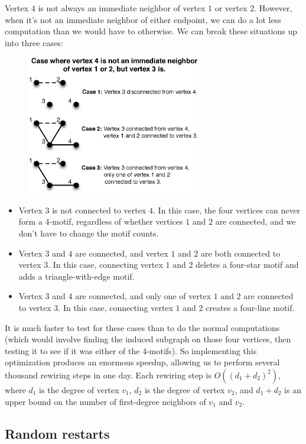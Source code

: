 Vertex $4$ is not always an immediate neighbor of vertex $1$ or vertex $2$.  However, when it's not an immediate neighbor of either endpoint, we can do a lot less computation than we would have to otherwise.  We can break these situations up into three cases:

\begin{figure}[t]
\centering
\includegraphics[width=3in]{Figures/case1.eps}
\label{fig:case}
\end{figure}

\begin{itemize}
\item Vertex $3$ is not connected to vertex $4$.  In this case, the four vertices can never form a 4-motif, regardless of whether vertices $1$ and $2$ are connected, and we don't have to change the motif counts.
\item Vertex $3$ and $4$ are connected, and vertex $1$ and $2$ are both connected to vertex $3$.  In this case, connecting vertex $1$ and $2$ deletes a four-star motif and adds a triangle-with-edge motif.
\item Vertex $3$ and $4$ are connected, and only one of vertex $1$ and $2$ are connected to vertex $3$.  In this case, connecting vertex $1$ and $2$ creates a four-line motif.
\end{itemize}

It is much faster to test for these cases than to do the normal
computations (which would involve finding the induced subgraph on those
four vertices, then testing it to see if it was either of the 4-motifs).
So implementing this optimization produces an enormous speedup, allowing us
to perform several thousand rewiring steps in one day.  Each rewiring step
is $O((d_1 + d_2)^2)$, where $d_1$ is the degree of vertex $v_1$, $d_2$
is the degree of vertex $v_2$, and $d_1 + d_2$ is an upper bound on the 
number of first-degree neighbors of $v_1$ and $v_2$.

\subsection{Random restarts}

